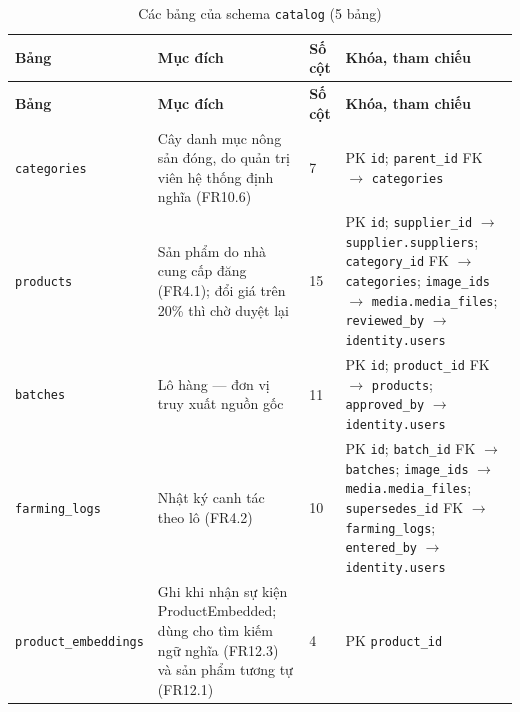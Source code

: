 \begingroup
\tblsetup\footnotesize\renewcommand{\arraystretch}{1.1}
\begin{longtable}{L{3.20cm} L{5.60cm} L{1.10cm} L{5.00cm}}
\caption{Các bảng của schema \texttt{catalog} (5 bảng)}
\label{tab:db-catalog} \\
\toprule
{}
\textbf{Bảng} & \textbf{Mục đích} & \textbf{Số cột} & \textbf{Khóa, tham chiếu} \\
\midrule
\endfirsthead
\toprule
{}
\textbf{Bảng} & \textbf{Mục đích} & \textbf{Số cột} & \textbf{Khóa, tham chiếu} \\
\midrule
\endhead
\bottomrule
\endfoot
\texttt{categories} & Cây danh mục nông sản đóng, do quản trị viên hệ thống định nghĩa (FR10.6) & 7 & PK \texttt{id}; \texttt{parent\_\allowbreak{}id} FK $\to$ \texttt{categories} \\
\texttt{products} & Sản phẩm do nhà cung cấp đăng (FR4.1); đổi giá trên 20\% thì chờ duyệt lại & 15 & PK \texttt{id}; \texttt{supplier\_\allowbreak{}id} $\to$ \texttt{supplier.suppliers}; \texttt{category\_\allowbreak{}id} FK $\to$ \texttt{categories}; \texttt{image\_\allowbreak{}ids} $\to$ \texttt{media.media\_\allowbreak{}files}; \texttt{reviewed\_\allowbreak{}by} $\to$ \texttt{identity.users} \\
\texttt{batches} & Lô hàng — đơn vị truy xuất nguồn gốc & 11 & PK \texttt{id}; \texttt{product\_\allowbreak{}id} FK $\to$ \texttt{products}; \texttt{approved\_\allowbreak{}by} $\to$ \texttt{identity.users} \\
\texttt{farming\_\allowbreak{}logs} & Nhật ký canh tác theo lô (FR4.2) & 10 & PK \texttt{id}; \texttt{batch\_\allowbreak{}id} FK $\to$ \texttt{batches}; \texttt{image\_\allowbreak{}ids} $\to$ \texttt{media.media\_\allowbreak{}files}; \texttt{supersedes\_\allowbreak{}id} FK $\to$ \texttt{farming\_\allowbreak{}logs}; \texttt{entered\_\allowbreak{}by} $\to$ \texttt{identity.users} \\
\texttt{product\_\allowbreak{}embeddings} & Ghi khi nhận sự kiện ProductEmbedded; dùng cho tìm kiếm ngữ nghĩa (FR12.3) và sản phẩm tương tự (FR12.1) & 4 & PK \texttt{product\_\allowbreak{}id} \\
\end{longtable}
\endgroup

